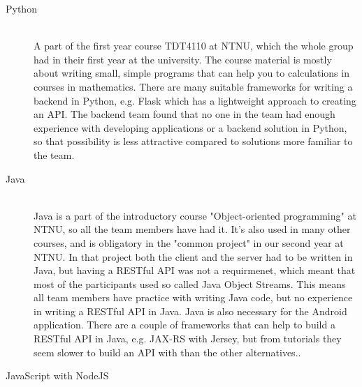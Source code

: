 \begin{description}
    \item[Python] \hfill \\
        A part of the first year course TDT4110 at NTNU, which the whole group had in their first year at the university. The course material is mostly about writing small, simple programs that can help you to calculations in courses in mathematics. There are many suitable frameworks for writing a backend in Python, e.g. Flask which has a lightweight approach to creating an API.\cite{python-flask} The backend team found that no one in the team  had enough experience with developing applications or a backend solution in Python, so that possibility is less attractive compared to solutions more familiar to the team.
    \item[Java] \hfill \\
        Java is a part of the introductory course "Object-oriented programming" at NTNU, so all the team members have had it. It's also used in many other courses, and is obligatory in the "common project" in our second year at NTNU. In that project both the client and the server had to be written in Java, but having a RESTful API was not a requirmenet, which meant that most of the participants used so called Java Object Streams. This means all team members have practice with writing Java code, but no experience in writing a RESTful API in Java. Java is also necessary for the Android application. There are a couple of frameworks that can help to build a RESTful API in Java, e.g. JAX-RS with Jersey, but from tutorials they seem slower to build an API with than the other alternatives.\cite{java-backend-jaxrs-tutorial}.
    \item[JavaScript with NodeJS] \hfill \\

\end{description}
